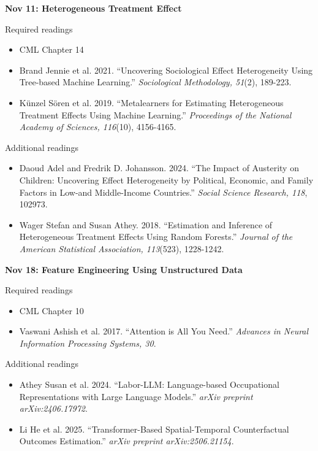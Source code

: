 \documentclass[12pt]{article}
\begin{document}
\vspace{1em} \noindent \textbf{\textcolor{titlecolor}{Nov 11: Heterogeneous Treatment Effect}}

\noindent Required readings
\begin{itemize}
    \item CML Chapter 14
    \item Brand Jennie et al. 2021. ``Uncovering Sociological Effect Heterogeneity Using Tree-based Machine Learning.'' \textit{Sociological Methodology, 51}(2), 189-223.
    \item Künzel Sören et al. 2019. ``Metalearners for Estimating Heterogeneous Treatment Effects Using Machine Learning.'' \textit{Proceedings of the National Academy of Sciences, 116}(10), 4156-4165.
\end{itemize}

\noindent Additional readings
\begin{itemize}
    \item Daoud Adel and Fredrik D. Johansson. 2024. ``The Impact of Austerity on Children: Uncovering Effect Heterogeneity by Political, Economic, and Family Factors in Low-and Middle-Income Countries.'' \textit{Social Science Research, 118}, 102973.
    \item Wager Stefan and Susan Athey. 2018. ``Estimation and Inference of Heterogeneous Treatment Effects Using Random Forests.'' \textit{Journal of the American Statistical Association, 113}(523), 1228-1242.
\end{itemize}

\vspace{1em} \noindent \textbf{\textcolor{titlecolor}{Nov 18: Feature Engineering Using Unstructured Data}}

\noindent Required readings
\begin{itemize}
    \item CML Chapter 10
    \item Vaswani Ashish et al. 2017. ``Attention is All You Need.'' \textit{Advances in Neural Information Processing Systems, 30}.
\end{itemize}

\noindent Additional readings
\begin{itemize}
    \item Athey Susan et al. 2024. ``Labor-LLM: Language-based Occupational Representations with Large Language Models.'' \textit{arXiv preprint arXiv:2406.17972}.
    \item Li He et al. 2025. ``Transformer-Based Spatial-Temporal Counterfactual Outcomes Estimation.'' \textit{arXiv preprint arXiv:2506.21154}.
\end{itemize}
\end{document}
